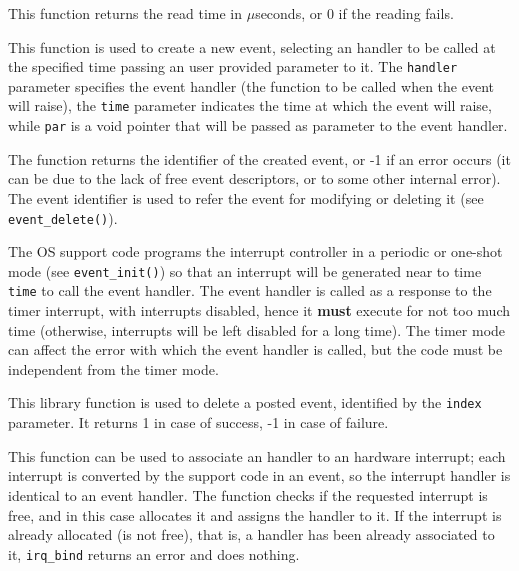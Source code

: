 \documentclass[a4paper]{report}
\begin{document}
This function returns the read time in $\mu$seconds, or $0$ if the
reading fails.


This function is used to create a new event, selecting an handler to
be called at the specified time passing an user provided parameter to
it. The {\tt handler} parameter specifies the event handler (the
function to be called when the event will raise), the {\tt time}
parameter indicates the time at which the event will raise, while
{\tt par} is a void pointer that will be passed as parameter to
the event handler.

The function returns the identifier of the created event, or -1 if an
error occurs (it can be due to the lack of free event
descriptors,  or to some other internal error). The event identifier
is used to refer the event for modifying or deleting it (see
{\tt event\_delete()}).

The OS support code programs the interrupt controller in a periodic
or one-shot mode (see {\tt event\_init()}) so that an interrupt will be
generated near to time {\tt time} to call the event handler. The
event handler is called as a response to the timer interrupt, with
interrupts disabled, hence it {\bf must} execute for not too much time
(otherwise, interrupts will be left disabled for a long time). The
timer mode can affect the error  with which the event handler is
called, but the code must be independent  from the timer mode.


This library function is used to delete a posted event, identified by
the {\tt index} parameter. It returns 1 in case of success, -1 in
case of failure.


This function can be used to associate an handler to an hardware
interrupt; each interrupt is converted by the support code in an
event, so the interrupt handler is identical to an event handler. The
function checks if the requested interrupt is free, and in this case
allocates it and assigns the handler to it. If the interrupt is
already allocated (is not free), that is, a handler has been already
associated to it, {\tt irq\_bind} returns an error and does nothing.
\end{document}
